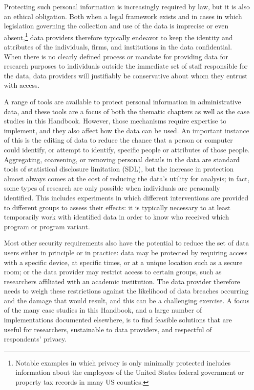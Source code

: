 \documentclass[
]{book}
\begin{document}
Protecting such personal information is increasingly required by law, but it is also an ethical obligation. Both when a legal framework exists and in cases in which legislation governing the collection and use of the data is imprecise or even absent,\footnote{Notable examples in which privacy is only minimally protected includes information about the employees of the United States federal government or property tax records in many US counties.} data providers therefore typically endeavor to keep the identity and attributes of the individuals, firms, and institutions in the data confidential. When there is no clearly defined process or mandate for providing data for research purposes to individuals outside the immediate set of staff responsible for the data, data providers will justifiably be conservative about whom they entrust with access.

A range of tools are available to protect personal information in administrative data, and these tools are a focus of both the thematic chapters as well as the case studies in this Handbook. However, those mechanisms require expertise to implement, and they also affect how the data can be used. An important instance of this is the editing of data to reduce the chance that a person or computer could identify, or attempt to identify, specific people or attributes of those people. Aggregating, coarsening, or removing personal details in the data are standard tools of statistical disclosure limitation (SDL), but the increase in protection almost always comes at the cost of reducing the data's utility for analysis; in fact, some types of research are only possible when individuals are personally identified. This includes experiments in which different interventions are provided to different groups to assess their effects: it is typically necessary to at least temporarily work with identified data in order to know who received which program or program variant.

Most other security requirements also have the potential to reduce the set of data users either in principle or in practice: data may be protected by requiring access with a specific device, at specific times, or at a unique location such as a secure room; or the data provider may restrict access to certain groups, such as researchers affiliated with an academic institution. The data provider therefore needs to weigh these restrictions against the likelihood of data breaches occurring and the damage that would result, and this can be a challenging exercise. A focus of the many case studies in this Handbook, and a large number of implementations documented elsewhere, is to find feasible solutions that are useful for researchers, sustainable to data providers, and respectful of respondents' privacy.
\end{document}
